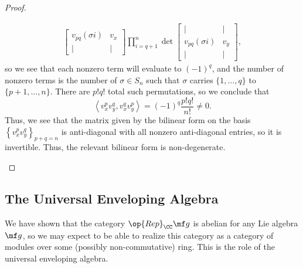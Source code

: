 \documentclass[../notes.tex]{subfiles}
\begin{document}
\begin{proof}
\begin{enumerate}
\begin{align*}
\begin{bmatrix}
				v_{pq}(\sigma i) & v_x \\
				| & |
			\end{bmatrix}\prod_{i=q+1}^{n}\det\begin{bmatrix}
				| & | \\
				v_{pq}(\sigma i) & v_y \\
				| & |
			\end{bmatrix},
		\end{align*}
		so we see that each nonzero term will evaluate to $(-1)^q$, and the number of nonzero terms is the number of $\sigma\in S_n$ such that $\sigma$ carries $\{1,\ldots,q\}$ to $\{p+1,\ldots,n\}$. There are $p!q!$ total such permutations, so we conclude that
		\[\left\langle v_x^pv_y^q,v_x^qv_y^p\right\rangle=(-1)^q\frac{p!q!}{n!}\ne0.\]
		Thus, we see that the matrix given by the bilinear form on the basis $\left\{v_x^pv_y^q\right\}_{p+q=n}$ is anti-diagonal with all nonzero anti-diagonal entries, so it is invertible. Thus, the relevant bilinear form is non-degen\-erate.
		\qedhere
	\end{enumerate}
\end{proof}

\subsection{The Universal Enveloping Algebra}
We have shown that the category $\op{Rep}_\CC\mf g$ is abelian for any Lie algebra $\mf g$, so we may expect to be able to realize this category as a category of modules over some (possibly non-commutative) ring. This is the role of the universal enveloping algebra.
\end{document}

